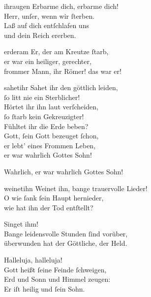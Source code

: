 \documentclass[abbrwidth=6em,tocstyle=ref-genre,toe=false]{ees}
\begin{document}
{\begin{movement}{ihraugen}
  Erbarme dich, erbarme dich!\\
  Herr, unſer, wenn wir ſterben.\\
  Laß auf dich entſchlafen uns\\
  und dein Reich ererben.
\end{movement}

\begin{movement}{erderam}
  \voice[Hauptmann]
  Er, der am Kreutze ſtarb,\\
  er war ein heiliger, gerechter,\\
  frommer Mann, ihr Römer! das war er!
\end{movement}

\begin{movement}{sahetihr}
  \voice[Hauptmann]
  Sahet ihr den göttlich leiden,\\
  ſo litt nie ein Sterblicher!\\
  Hörtet ihr ihn laut verſcheiden,\\
  ſo ſtarb kein Gekreuzigter!\\
  Fühltet ihr die Erde beben?\\
  Gott, ſein Gott bezeuget ſchon,\\
  er lebt’ eines Frommen Leben,\\
  er war wahrlich Gottes Sohn!

  \voice[Chor]
  Wahrlich, er war wahrlich Gottes Sohn!
\end{movement}

\begin{movement}{weinetihn}
  Weinet ihn, bange trauervolle Lieder!\\
  O wie ſank ſein Haupt hernieder,\\
  wie hat ihn der Tod entſtellt?

  Singet ihm!\\
  Bange leidensvolle Stunden ſind vorüber,\\
  überwunden hat der Göttliche, der Held.

  \voice[Chor]
  Halleluja, halleluja!\\
  Gott heißt ſeine Feinde ſchweigen,\\
  Erd und Sonn und Himmel zeugen:\\
  Er iſt heilig und ſein Sohn.
\end{movement}

}
\end{document}
